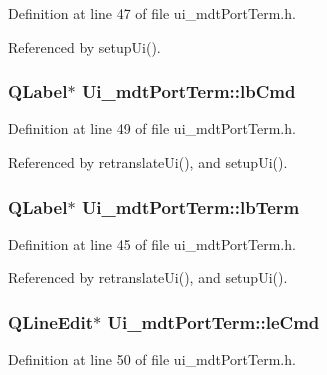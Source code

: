 Definition at line 47 of file ui\-\_\-mdt\-Port\-Term.\-h.



Referenced by setup\-Ui().

\hypertarget{class_ui__mdt_port_term_ab0b157b2e4d7916fdca147efb61616d5}{
\subsubsection[{lb\-Cmd}]{\setlength{\rightskip}{0pt plus 5cm}Q\-Label$\ast$ Ui\-\_\-mdt\-Port\-Term\-::lb\-Cmd}}\label{class_ui__mdt_port_term_ab0b157b2e4d7916fdca147efb61616d5}


Definition at line 49 of file ui\-\_\-mdt\-Port\-Term.\-h.



Referenced by retranslate\-Ui(), and setup\-Ui().

\hypertarget{class_ui__mdt_port_term_a9fe35feb5504ff573d5fa61f81b7e3da}{
\subsubsection[{lb\-Term}]{\setlength{\rightskip}{0pt plus 5cm}Q\-Label$\ast$ Ui\-\_\-mdt\-Port\-Term\-::lb\-Term}}\label{class_ui__mdt_port_term_a9fe35feb5504ff573d5fa61f81b7e3da}


Definition at line 45 of file ui\-\_\-mdt\-Port\-Term.\-h.



Referenced by retranslate\-Ui(), and setup\-Ui().

\hypertarget{class_ui__mdt_port_term_abd502c5675bd636af95e9cdb6f5e2680}{
\subsubsection[{le\-Cmd}]{\setlength{\rightskip}{0pt plus 5cm}Q\-Line\-Edit$\ast$ Ui\-\_\-mdt\-Port\-Term\-::le\-Cmd}}\label{class_ui__mdt_port_term_abd502c5675bd636af95e9cdb6f5e2680}


Definition at line 50 of file ui\-\_\-mdt\-Port\-Term.\-h.



